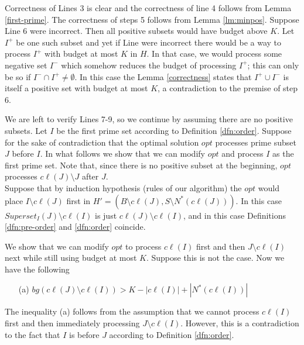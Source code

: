 \documentclass[letterpaper,11pt,abstracton]{scrartcl}
\begin{document}
Correctness of Lines 3 is clear and the correctness of line 4 follows from Lemma \ref{first-prime}.
The correctness of steps 5 follows from Lemma \ref{lm:minpos}. Suppose Line 6 were incorrect. Then
all positive subsets would have budget above $K$. Let $I^+$ be one such subset and yet if 
Line were incorrect there would be a way to process $I^+$ with budget at most $K$ in $H$. In that case, we would process some negative set
$I^-$ which somehow reduces the budget of processing $I^+$; this can
only be so if $I^-\cap I^+ \neq \emptyset$.  In this case the Lemma
\ref{correctness} states that $I^+ \cup I^-$
is itself a positive set with budget at most $K$, a contradiction to
the premise of step 6.


We are left to verify Lines 7-9, so we continue by assuming there are
no positive subsets. Let $I$ be the first prime set according to Definition \ref{dfn:order}.
Suppose for the sake of contradiction that the optimal solution $opt$ processes
prime subset $J$ before $I$. In what follows we show that we can modify $opt$ and process $I$ as the first prime set. Note that, since there is no positive subset at the beginning, $opt$ processes $c\ell(J) \setminus J$ after $J$.\\




Suppose that by induction hypothesis (rules of our algorithm) the $opt$
would place $I \setminus c\ell(J)$ first in $H'=(B \setminus c\ell(J), S\setminus N^*(c\ell(J)))$. In this case $Superset_I(J) \setminus c\ell(I)$
is just $c\ell(J) \setminus c\ell(I)$, and in this case Definitions \ref{dfn:pre-order} and
\ref{dfn:order} coincide.


We show that we can modify $opt$ to process $c \ell(I)$ first and then
$J \setminus c\ell(I)$ next while still using budget at most $K$. Suppose this is not the
case. Now we have the following

\begin{itemize}


\item [(a)] $bg(c\ell(J) \setminus c\ell(I))  > K- |c\ell(I)|+|N^*(c\ell(I)) |$

\end{itemize}



The inequality (a) follows from the assumption that we cannot process $c\ell(I)$ first and then immediately processing
$ J \setminus c\ell(I)$. However, this is a contradiction to the fact that $I$ is before $J$ according to Definition \ref{dfn:order}.
\end{document}
